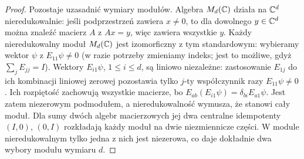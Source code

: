 \begin{proof}
Pozostaje uzasadnić wymiary modułów. Algebra
$M_d(\mathbb{C})$ działa na $\mathbb{C}^d$ nieredukowalnie:
jeśli podprzestrzeń zawiera $x\ne0$, to
dla dowolnego $y\in\mathbb{C}^d$ można znaleźć
macierz $A$ z $Ax=y$, więc zawiera wszystkie $y$.
Każdy nieredukowalny moduł $M_d(\mathbb{C})$ jest
izomorficzny z tym standardowym: wybieramy
wektor $\psi$ z $E_{11}\psi\ne0$ (w razie potrzeby
zmieniamy indeks; jest to możliwe, gdyż
$\sum_jE_{jj}=I$). Wektory
$E_{i1}\psi$, $1\leq i\leq d$, są liniowo
niezależne: zastosowanie $E_{1j}$ do ich
kombinacji liniowej zerowej pozostawia
tylko $j$-ty współczynnik razy
$E_{11}\psi\ne0$. Ich rozpiętość zachowują
wszystkie macierze, bo
$E_{ab}(E_{i1}\psi)=\delta_{bi}E_{a1}\psi$.
Jest zatem niezerowym podmodułem, a
nieredukowalność wymusza, że stanowi cały moduł.
Dla sumy dwóch algebr macierzowych jej
dwa centralne idempotenty $(I,0)$, $(0,I)$
rozkładają każdy moduł na dwie niezmiennicze
części. W module nieredukowalnym tylko jedna
z nich jest niezerowa, co daje dokładnie
dwa wybory modułu wymiaru $d$.
\end{proof}


